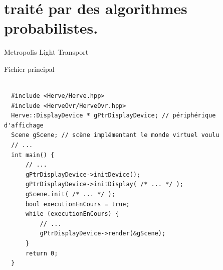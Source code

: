 \documentclass[10pt]{beamer}
\begin{document}

\section{traité par des algorithmes probabilistes.}

\begin{frame}{\large \insertsection}
    \begin{block}{Metropolis Light Transport \cite{Veach1997}}
        \begin{algorithm}[H]
            \DontPrintSemicolon
        \end{algorithm}
    \end{block} 
\end{frame}

\begin{frame}[fragile]{\large \insertsection}
    \begin{block}{Fichier principal}
        \begin{verbatim}

  #include <Herve/Herve.hpp>
  #include <HerveOvr/HerveOvr.hpp>
  Herve::DisplayDevice * gPtrDisplayDevice; // périphérique d'affichage
  Scene gScene; // scène implémentant le monde virtuel voulu
  // ...
  int main() {
      // ...
      gPtrDisplayDevice->initDevice();
      gPtrDisplayDevice->initDisplay( /* ... */ );
      gScene.init( /* ... */ ); 
      bool executionEnCours = true;
      while (executionEnCours) {
          // ...
          gPtrDisplayDevice->render(&gScene);
      }
      return 0;
  }

        \end{verbatim}
    \end{block} 
\end{frame}
\end{document}
